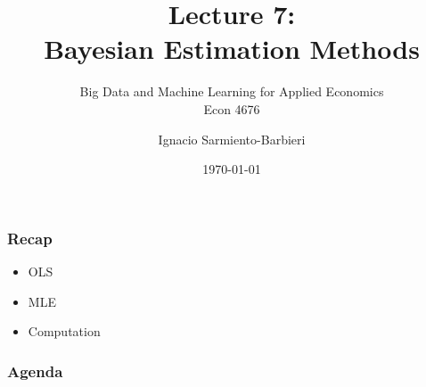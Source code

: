 \documentclass[
  shownotes,
  xcolor={svgnames},
  hyperref={colorlinks,citecolor=DarkBlue,linkcolor=DarkRed,urlcolor=DarkBlue}
  , aspectratio=169]{beamer}
\begin{document}
\title[Lecture 7]{Lecture 7: \\  Bayesian Estimation Methods}
\subtitle{Big Data and Machine Learning for Applied Economics \\ Econ 4676}
\date{\today}

\author[Sarmiento-Barbieri]{Ignacio Sarmiento-Barbieri}


\begin{frame}[noframenumbering]
\maketitle
\end{frame}



\begin{frame}
\frametitle{Recap}

\begin{itemize} 

    \item OLS      
    \bigskip
    \item MLE
    \bigskip
    \item Computation
    
  
\end{itemize}
\end{frame}


\begin{frame}
\frametitle{Agenda}

\tableofcontents


\end{frame}





\end{document}
